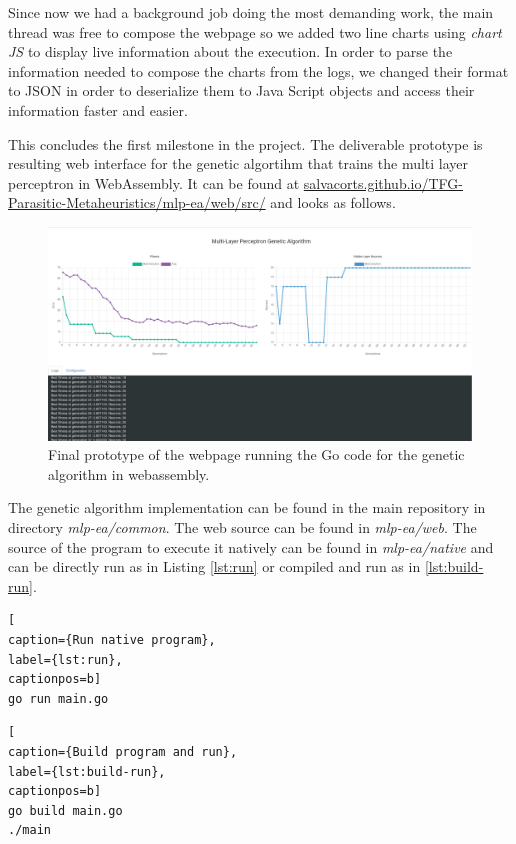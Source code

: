 Since now we had a background job doing the most demanding work, the main thread was free to compose the webpage so we added two line charts using \textit{chart JS} to display live information about the execution. In order to parse the information needed to compose the charts from the logs, we changed their format to JSON in order to deserialize them to Java Script objects and access their information faster and easier.

This concludes the first milestone in the project. The deliverable prototype is resulting web interface for the genetic algortihm that trains the multi layer perceptron in WebAssembly. It can be found at \href{https://salvacorts.github.io/TFG-Parasitic-Metaheuristics/mlp-ea/web/src/}{salvacorts.github.io/TFG-Parasitic-Metaheuristics/mlp-ea/web/src/} and looks as follows.

\begin{figure}[h!]
		\centering
    	\includegraphics[width=\linewidth]{assets/images/web-milestone1.png}
    	\caption{Final prototype of the webpage running the Go code for the genetic algorithm in webassembly.}
    	\label{image:web-milestone1}
\end{figure}

The genetic algorithm implementation can be found in the main repository in directory \textit{mlp-ea/common}. The web source can be found in \textit{mlp-ea/web}. The source of the program to execute it natively can be found in \textit{mlp-ea/native} and can be directly run as in Listing \ref{lst:run} or compiled and run as in \ref{lst:build-run}.

\begin{lstlisting}[
caption={Run native program},
label={lst:run},
captionpos=b]
go run main.go
\end{lstlisting} 

\begin{lstlisting}[
caption={Build program and run},
label={lst:build-run},
captionpos=b]
go build main.go
./main
\end{lstlisting} 